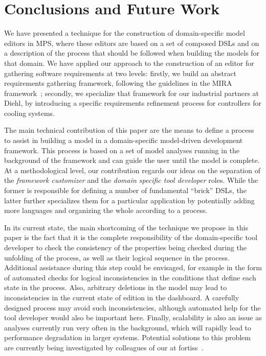 \section{Conclusions and Future Work}
\label{sec:conclusion}

We have presented a technique for the construction of
domain-specific model editors in MPS, where these editors are based on
a set of composed DSLs and on a description of the process that
should be followed when building the models for that domain. We have applied our
approach to the construction of an editor for gathering software requirements
at two levels: firstly, we build an abstract requirements gathering framework,
following the guidelines in the MIRA framework~\cite{MIRA13}; secondly, we
specialize that framework for our industrial partners at Diehl, by introducing
a specific requirements refinement process for controllers for cooling systems.

The main technical contribution of this paper are the means to define a process
to assist in building a model in a domain-specific model-driven development
framework. This process is based on a set of model analyses running in the
background of the framework and can guide the user until the model is complete.
At a methodological level, our contribution regards our ideas on the separation
of the \emph{framework customizer} and the  \emph{domain specific tool
developer} roles. While the former is responsible for defining a number of
fundamental ``brick'' DSLs, the latter further specializes them for a particular
application by potentially adding more languages and organizing the whole
according to a process.

In its current state, the main shortcoming of the technique we propose in this
paper is the fact that it is the complete responsibility of the domain-specific
tool developer to check the consistency of the properties being checked during
the unfolding of the process, as well as their logical sequence in the process.
Additional assistance during this step could be envisaged, for example in the
form of automated checks for logical inconsistencies in the conditions that
define each state in the process. Also, arbitrary deletions in the model may
lead to inconsistencies in the current state of edition in the dashboard. A
carefully designed process may avoid such inconsistencies, although automated
help for the tool developer would also be important here. Finally, scalability
is also an issue as analyses currently run very often in the background,
which will rapidly lead to performance degradation in larger systems. Potential
solutions to this problem are currently being investigated by colleagues of our
at fortiss~\cite{Models17Sudeep}.

